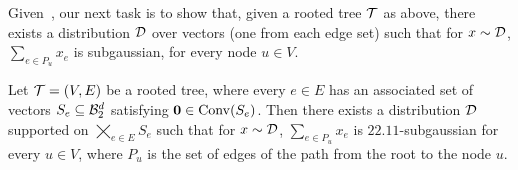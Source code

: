


Given~, our next task is to show that, given a rooted tree $\mathcal{T}$ as above, there exists a distribution $\mathcal{D}$ over vectors (one from each edge set) such that for $x \sim \mathcal{D}$, $\sum_{e \in P_u} x_e$ is subgaussian, for every node $u \in V$. 


\begin{theorem}\label{theorem:tree-subgaussianity}
    Let $\mathcal{T} = (V,E)$ be a rooted tree, where every $e \in E$ has an associated set of vectors $S_e \subseteq \mathcal{B}^d_2$ satisfying $\mathbf{0} \in \mathrm{Conv}(S_e)$. Then there exists a distribution $\mathcal{D}$ supported on $\bigtimes_{e \in E} S_e$ such that for $x \sim \mathcal{D}$, $\sum_{e \in P_u} x_e$ is $22.11$-subgaussian for every $u \in V$, where $P_u$ is the set of edges of the path from the root to the node $u$.
\end{theorem}





    
    
    


